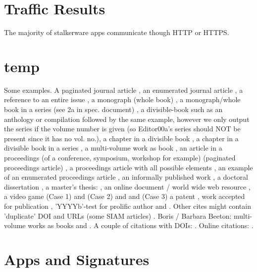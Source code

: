 \documentclass[acmtog]{acmart}
\begin{document}
\section{Traffic Results}

The majority of stalkerware apps communicate though HTTP or HTTPS.

\section{temp}

Some examples.  A paginated journal article \cite{Abril07}, an enumerated 
journal article \cite{Cohen07}, a reference to an entire issue \cite{JCohen96}, 
a monograph (whole book) \cite{Kosiur01}, a monograph/whole book in a series 
(see 2a in spec. document)
\cite{Harel79}, a divisible-book such as an anthology or compilation 
\cite{Editor00} followed by the same example, however we only output the series 
if the volume number is given \cite{Editor00a} (so Editor00a's series should 
NOT be present since it has no vol. no.),
a chapter in a divisible book \cite{Spector90}, a chapter in a divisible book 
in a series \cite{Douglass98}, a multi-volume work as book \cite{Knuth97}, an 
article in a proceedings (of a conference, symposium, workshop for example) 
(paginated proceedings article) \cite{Andler79}, a proceedings article with all 
possible elements \cite{Smith10}, an example of an enumerated proceedings 
article \cite{VanGundy07}, an informally published work \cite{Harel78}, a 
doctoral dissertation \cite{Clarkson85}, a master's thesis: \cite{anisi03}, an 
online document / world wide web resource \cite{Thornburg01, Ablamowicz07, 
Poker06}, a video game (Case 1) \cite{Obama08} and (Case 2) \cite{Novak03} and 
\cite{Lee05} and (Case 3) a patent \cite{JoeScientist001}, work accepted for 
publication \cite{rous08}, 'YYYYb'-test for prolific author \cite{SaeediMEJ10} 
and \cite{SaeediJETC10}. Other cites might contain 'duplicate' DOI and URLs 
(some SIAM articles) \cite{Kirschmer:2010:AEI:1958016.1958018}. Boris / Barbara 
Beeton: multi-volume works as books \cite{MR781536} and \cite{MR781537}. A 
couple of citations with DOIs: 
\cite{2004:ITE:1009386.1010128,Kirschmer:2010:AEI:1958016.1958018}. Online 
citations: \cite{TUGInstmem, Thornburg01, CTANacmart}.



%



% 
\appendix

\section{Apps and Signatures}
\end{document}
